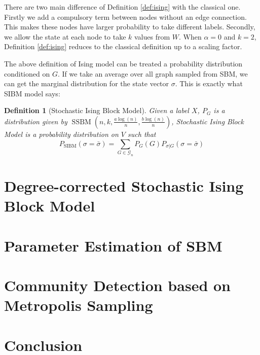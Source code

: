 \documentclass[journal]{IEEEtran}
\newtheorem{definition}{Definition}
\newcommand{\A}{\frac{a \log(n)}{n}}
\newcommand{\B}{\frac{b \log(n)}{n}}
\newcommand{\cG}{\mathcal{G}}
\DeclareMathOperator{\SSBM}{SSBM}
\DeclareMathOperator{\SIBM}{SIBM}
\begin{document}
There are two main difference of Definition \ref{def:ising} with the classical one. Firstly we add a compulsory term
between nodes without an edge connection. This makes these nodes have larger probability to take different labels.
Secondly, we allow the state at each node to take $k$ values from $W$.
When $\alpha = 0$ and $k=2$, Definition \ref{def:ising}
reduces to the classical definition up to a scaling factor.

The above definition of Ising model can be treated a probability distribution conditioned on $G$.
If we take an average over all graph sampled from SBM, we can get the marginal distribution for the state vector $\sigma$.
This is exactly what SIBM model says:
\begin{definition}[Stochastic Ising Block Model]
	Given a label $X$, $P_G$ is a distribution given by $\SSBM(n,k,\A,\B)$, Stochastic Ising Block Model
	is a probability distribution on $V$ such that
	\begin{equation}
	P_{\SIBM}(\sigma = \bar{\sigma}) = \sum_{G \in \cG_n} P_G(G) P_{\sigma | G}(\sigma = \bar{\sigma}) 
	\end{equation}
\end{definition}

\section{Degree-corrected Stochastic Ising Block Model}\label{sec:dcsibm}
\section{Parameter Estimation of SBM}\label{sec:psbm}
\section{Community Detection based on Metropolis Sampling}\label{sec:ms}
\section{Conclusion}


\end{document}
